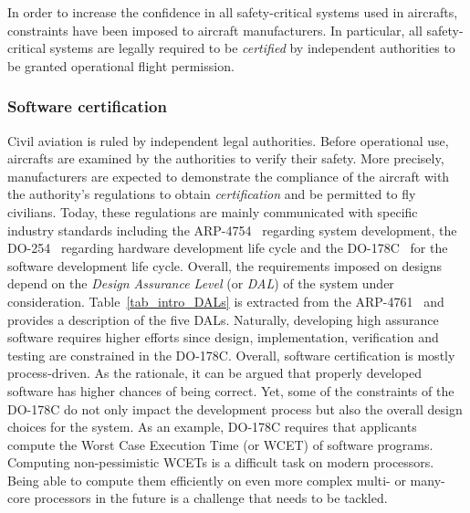 \documentclass[main.tex]{subfiles}
\begin{document}
In order to increase the confidence in all safety-critical systems used in
aircrafts, constraints have been imposed to aircraft manufacturers. In
particular, all safety-critical systems are legally required to be
\emph{certified} by independent authorities to be granted operational flight
permission.

\subsubsection{Software certification} Civil aviation is ruled by independent
legal authorities. Before operational use, aircrafts are examined by the
authorities to verify their safety. More precisely, manufacturers are expected
to demonstrate the compliance of the aircraft with the authority's regulations
to obtain \emph{certification} and be permitted to fly civilians. Today, these
regulations are mainly communicated with specific industry standards including
the ARP-4754~\cite{arp4754} regarding system development, the
DO-254~\cite{do178} regarding hardware development life cycle and the
DO-178C~\cite{do178} for the software development life cycle.  Overall, the
requirements imposed on designs depend on the \emph{Design Assurance Level} (or
\emph{DAL}) of the system under consideration. Table~\ref{tab_intro_DALs} is
extracted from the ARP-4761~\cite{arp4761} and provides a description of the
five DALs. Naturally, developing high assurance software requires higher
efforts since design, implementation, verification and testing are constrained
in the DO-178C.  Overall, software certification is mostly process-driven. As
the rationale, it can be argued that properly developed software has higher
chances of being correct. Yet, some of the constraints of the DO-178C do not
only impact the development process but also the overall design choices for the
system. As an example, DO-178C requires that applicants compute the Worst Case
Execution Time (or WCET) of software programs. Computing non-pessimistic WCETs
is a difficult task on modern processors. Being able to compute them
efficiently on even more complex multi- or many-core processors in the future
is a challenge that needs to be tackled.
\end{document}

